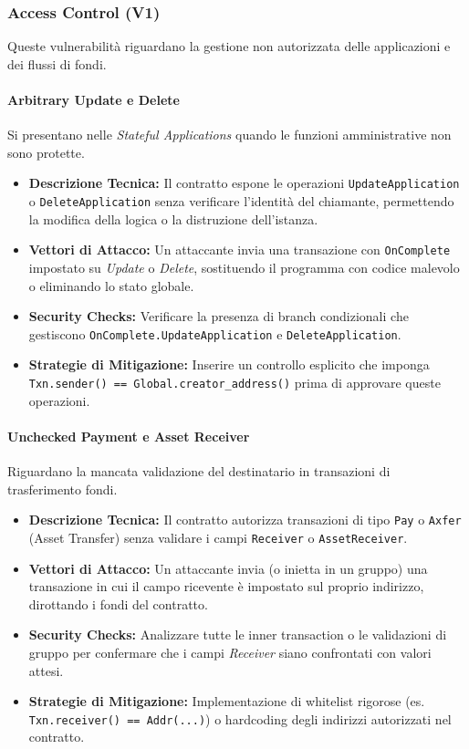 \subsubsection{Access Control (V1)}
Queste vulnerabilità riguardano la gestione non autorizzata delle applicazioni e dei flussi di fondi.

\paragraph{Arbitrary Update e Delete} 
Si presentano nelle \textit{Stateful Applications} quando le funzioni amministrative non sono protette.
\begin{itemize}
    \item \textbf{Descrizione Tecnica:} Il contratto espone le operazioni \texttt{UpdateApplication} o \texttt{DeleteApplication} senza verificare l'identità del chiamante, permettendo la modifica della logica o la distruzione dell'istanza.
    \item \textbf{Vettori di Attacco:} Un attaccante invia una transazione con \texttt{OnComplete} impostato su \textit{Update} o \textit{Delete}, sostituendo il programma con codice malevolo o eliminando lo stato globale.
    \item \textbf{Security Checks:} Verificare la presenza di branch condizionali che gestiscono \texttt{OnComplete.UpdateApplication} e \texttt{DeleteApplication}.
    \item \textbf{Strategie di Mitigazione:} Inserire un controllo esplicito che imponga \texttt{Txn.sender() == Global.creator\_address()} prima di approvare queste operazioni.
\end{itemize}

\paragraph{Unchecked Payment e Asset Receiver}
Riguardano la mancata validazione del destinatario in transazioni di trasferimento fondi.
\begin{itemize}
    \item \textbf{Descrizione Tecnica:} Il contratto autorizza transazioni di tipo \texttt{Pay} o \texttt{Axfer} (Asset Transfer) senza validare i campi \texttt{Receiver} o \texttt{AssetReceiver}.
    \item \textbf{Vettori di Attacco:} Un attaccante invia (o inietta in un gruppo) una transazione in cui il campo ricevente è impostato sul proprio indirizzo, dirottando i fondi del contratto.
    \item \textbf{Security Checks:} Analizzare tutte le inner transaction o le validazioni di gruppo per confermare che i campi \textit{Receiver} siano confrontati con valori attesi.
    \item \textbf{Strategie di Mitigazione:} Implementazione di whitelist rigorose (es. \texttt{Txn.receiver() == Addr(...)}) o hardcoding degli indirizzi autorizzati nel contratto.
\end{itemize}


